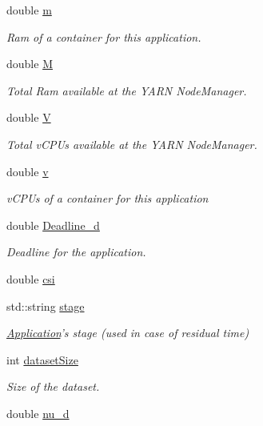 \begin{DoxyCompactItemize}
double \hyperlink{classApplication_ab903d83d3cde51569a27f97752c9f158}{m}
\begin{DoxyCompactList}\small\item\em Ram of a container for this application. \end{DoxyCompactList}\item 
double \hyperlink{classApplication_a14904a2abf46cc0a50eb82043fa0912e}{M}
\begin{DoxyCompactList}\small\item\em Total Ram available at the Y\-A\-R\-N Node\-Manager. \end{DoxyCompactList}\item 
double \hyperlink{classApplication_aa92ad37e6701931176e0dc9b260fd7ee}{V}
\begin{DoxyCompactList}\small\item\em Total v\-C\-P\-Us available at the Y\-A\-R\-N Node\-Manager. \end{DoxyCompactList}\item 
double \hyperlink{classApplication_a9efc167094a42382504dd28a7ac402e0}{v}
\begin{DoxyCompactList}\small\item\em v\-C\-P\-Us of a container for this application \end{DoxyCompactList}\item 
double \hyperlink{classApplication_a2a989ae288a74ee5250b5acf449c864a}{Deadline\-\_\-d}
\begin{DoxyCompactList}\small\item\em Deadline for the application. \end{DoxyCompactList}\item 
double \hyperlink{classApplication_a20adc533c6b6147342b3f60dc0fbd9bc}{csi}
\item 
std\-::string \hyperlink{classApplication_adb1cba2c06695bfdf81482dfba449d5b}{stage}
\begin{DoxyCompactList}\small\item\em \hyperlink{classApplication}{Application}'s stage (used in case of residual time) \end{DoxyCompactList}\item 
int \hyperlink{classApplication_aaa155e818d807f585d83ecacf4abfe42}{dataset\-Size}
\begin{DoxyCompactList}\small\item\em Size of the dataset. \end{DoxyCompactList}\item 
double \hyperlink{classApplication_a42c22b9a3130cf1f2722ce222f2e5bae}{nu\-\_\-d}

\end{DoxyCompactItemize}
